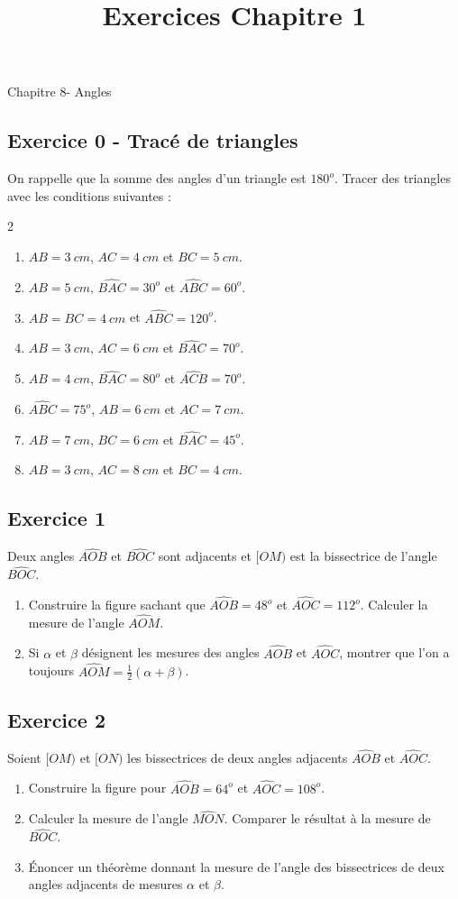 \documentclass[12 pt]{extarticle}
\title{Exercices Chapitre 1}
\date{}
\theoremstyle{plain}
\begin{document}
\begin{center}{\Large Chapitre 8- Angles}\\ 
 \end{center}
 
 \subsection*{Exercice 0 - Tracé de triangles}
 On rappelle que la somme des angles d'un triangle est $180^o$.
Tracer des triangles avec les conditions suivantes :
\begin{multicols}{2} \begin{enumerate}
\item $AB= 3~cm$, $AC=4~cm$ et $BC = 5~cm$.
\item $AB= 5~cm$, $\widehat{BAC} = 30^o$ et $\widehat{ABC}= 60^o$.
\item $AB=BC = 4~cm$ et $\widehat{ABC}= 120^o$. 
\item $AB= 3~cm$, $AC=6~cm$ et $\widehat{BAC}= 70^o$.
\item $AB = 4~cm$, $\widehat{BAC} = 80^o$ et $\widehat{ACB}= 70^o$.
\item $\widehat{ABC}= 75^o$, $AB= 6~cm$ et $AC= 7~cm$.
\item $AB = 7~cm$, $BC=6~cm$ et $\widehat{BAC}= 45^o$.
\item $AB= 3~cm$, $AC=8~cm$ et $BC = 4~cm$.

\end{enumerate} \end{multicols}
 
 \subsection*{Exercice 1}
 Deux angles $\widehat{AOB}$ et $\widehat{BOC}$ sont adjacents et $[OM)$ est la bissectrice de l'angle 
$\widehat{BOC}$. \begin{enumerate}
\item Construire la figure sachant que $\widehat{AOB}=48^o$ et $\widehat{AOC}= 112^o$. Calculer la mesure de
l'angle $\widehat{AOM}$. 
\item Si $\alpha$ et $\beta$ désignent les mesures des angles $\widehat{AOB}$ et $\widehat{AOC}$, montrer que l'on a toujours $\widehat{AOM}= \frac12(\alpha+\beta)$.  
\end{enumerate}
  
\subsection*{Exercice 2 }
  Soient $[OM)$ et $[ON)$ les bissectrices de deux angles adjacents $\widehat{AOB}$ et $\widehat{AOC}$. 
\begin{enumerate}
\item Construire la figure pour $\widehat{AOB}= 64^o$ et $\widehat{AOC}= 108^o$.
\item Calculer la mesure de l'angle $\widehat{MON}$. Comparer le résultat à la mesure de $\widehat{BOC}$. 
\item Énoncer un théorème donnant la mesure de l'angle des bissectrices de deux angles adjacents de mesures $\alpha$ et $\beta$.
\end{enumerate}
\end{document}
